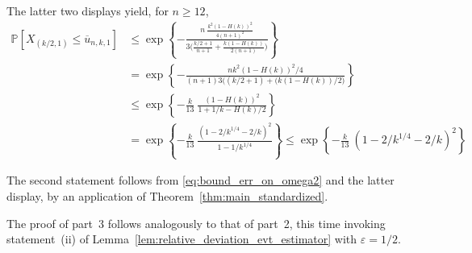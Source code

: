 \documentclass{article}
\numberwithin{equation}{section}
\renewcommand{\P}{\mathbb{P}}
\newcommand{\PP}{\P}%
\begin{document}
The latter two displays yield, for $n\ge 12$,  
\begin{align*}
    \PP[  X_{(k/2,1)}\le  \overline{ u}_{n,k,1} ]
&\le \exp\left\{ -\frac{n ~\frac{k^2 (1-H(k))^2}{4(n+1)^2} }{
3\Big( \frac{k/2+1}{n+1} + \frac{k (1-H(k))}{2(n+1)}\Big)}\right\}\\
&=\exp\left\{ -   \frac{nk^2 (1-H(k))^2/4 }{
(n+1)3\Big( (k/2+1) + (k (1-H(k))/2\Big)}\right\}\\
&\le \exp\left\{ -   \frac{k}{13} ~ \frac{(1-H(k))^2 }{
 1 + 1/k - H(k)/2}\right\} \\
& = \exp\left\{ -   \frac{k}{13} ~ \frac{(1- 2/k^{1/4} - 2/k)^2 }{
 1 -1/k^{1/4} }\right\} \le  \exp\left\{ -   \frac{k}{13} ~ (1- 2/k^{1/4} - 2/k)^2 \right\} 
\end{align*}
  
  The second statement follows from \eqref{eq:bound_err_on_omega2} and the latter display,  by an application of Theorem~\ref{thm:main_standardized}.


  The proof of part~3 follows analogously to that of part~2, this time invoking statement~(ii) of Lemma~\ref{lem:relative_deviation_evt_estimator} with $\varepsilon=1/2$.

  
\end{document}
